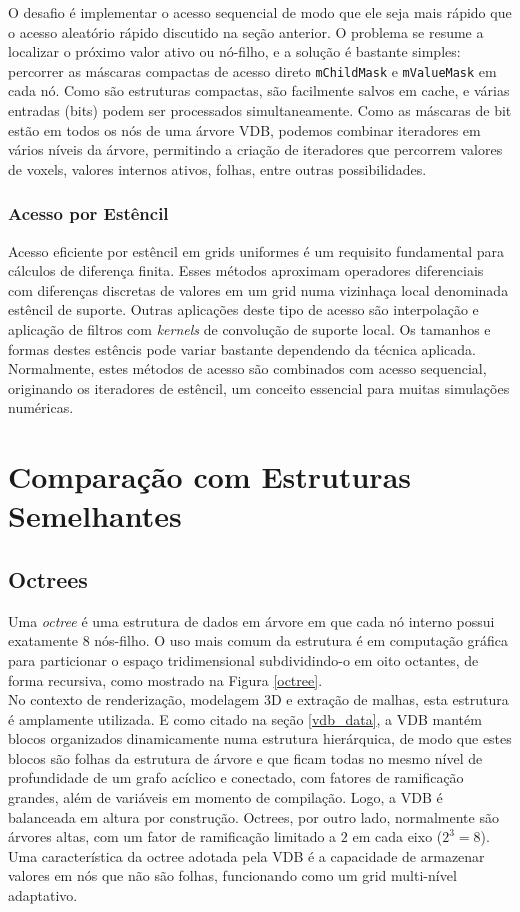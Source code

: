 O desafio é implementar o acesso sequencial de modo que ele seja mais rápido que o acesso aleatório rápido discutido na seção anterior. O problema se resume a localizar o próximo valor ativo ou nó-filho, e a solução é bastante simples: percorrer as máscaras compactas de acesso direto \texttt{mChildMask} e \texttt{mValueMask} em cada nó. Como são estruturas compactas, são facilmente salvos em cache, e várias entradas (bits) podem ser processados simultaneamente. Como as máscaras de bit estão em todos os nós de uma árvore VDB, podemos combinar iteradores em vários níveis da árvore, permitindo a criação de iteradores que percorrem valores de voxels, valores internos ativos, folhas, entre outras possibilidades.

\subsubsection{Acesso por Estêncil}
Acesso eficiente por estêncil em grids uniformes é um requisito fundamental para cálculos de diferença finita. Esses métodos aproximam operadores diferenciais com diferenças discretas de valores em um grid numa vizinhaça local denominada estêncil de suporte. Outras aplicações deste tipo de acesso são interpolação e aplicação de filtros com {\it kernels} de convolução de suporte local. Os tamanhos e formas destes estêncis pode variar bastante dependendo da técnica aplicada. Normalmente, estes métodos de acesso são combinados com acesso sequencial, originando os iteradores de estêncil, um conceito essencial para muitas simulações numéricas.

\section{Comparação com Estruturas Semelhantes}

\subsection{Octrees}
\label{octrees}

Uma \emph{octree} é uma estrutura de dados em árvore em que cada nó interno possui exatamente 8 nós-filho. O uso mais comum da estrutura é em computação gráfica para particionar o espaço tridimensional subdividindo-o em oito octantes, de forma recursiva, como mostrado na Figura \ref{octree}. \\

No contexto de renderização, modelagem 3D e extração de malhas, esta estrutura é amplamente utilizada. E como citado na seção \ref{vdb_data}, a VDB mantém blocos organizados dinamicamente numa estrutura hierárquica, de modo que estes blocos são folhas da estrutura de árvore e que ficam todas no mesmo nível de profundidade de um grafo acíclico e conectado, com fatores de ramificação grandes, além de variáveis em momento de compilação. Logo, a VDB é balanceada em altura por construção. Octrees, por outro lado, normalmente são árvores altas, com um fator de ramificação limitado a $2$ em cada eixo ($2^3 = 8$). 
Uma característica da octree adotada pela VDB é a capacidade de armazenar valores em nós que não são folhas, funcionando como um grid multi-nível adaptativo. 

